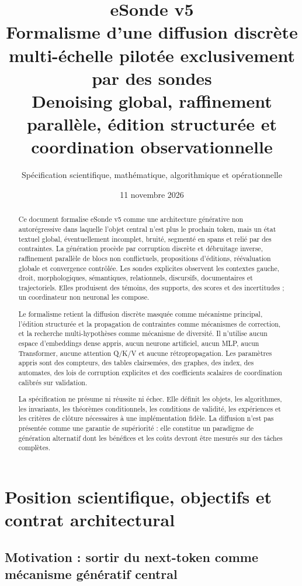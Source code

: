 \documentclass[11pt,a4paper,oneside]{report}
\title{\Huge eSonde v5\\[0.4em]\Large Formalisme d'une diffusion discrète multi-échelle pilotée exclusivement par des sondes\\[0.8em]\normalsize Denoising global, raffinement parallèle, édition structurée et coordination observationnelle}
\author{Spécification scientifique, mathématique, algorithmique et opérationnelle}
\date{11 novembre 2026}
\begin{document}
\maketitle
\begin{abstract}
Ce document formalise eSonde v5 comme une architecture générative non autorégressive dans laquelle l'objet central n'est plus le prochain token, mais un état textuel global, éventuellement incomplet, bruité, segmenté en spans et relié par des contraintes. La génération procède par corruption discrète et débruitage inverse, raffinement parallèle de blocs non conflictuels, propositions d'éditions, réévaluation globale et convergence contrôlée. Les sondes explicites observent les contextes gauche, droit, morphologiques, sémantiques, relationnels, discursifs, documentaires et trajectoriels. Elles produisent des témoins, des supports, des scores et des incertitudes ; un coordinateur non neuronal les compose.

Le formalisme retient la diffusion discrète masquée comme mécanisme principal, l'édition structurée et la propagation de contraintes comme mécanismes de correction, et la recherche multi-hypothèses comme mécanisme de diversité. Il n'utilise aucun espace d'embeddings dense appris, aucun neurone artificiel, aucun MLP, aucun Transformer, aucune attention Q/K/V et aucune rétropropagation. Les paramètres appris sont des compteurs, des tables clairsemées, des graphes, des index, des automates, des lois de corruption explicites et des coefficients scalaires de coordination calibrés sur validation.

La spécification ne présume ni réussite ni échec. Elle définit les objets, les algorithmes, les invariants, les théorèmes conditionnels, les conditions de validité, les expériences et les critères de clôture nécessaires à une implémentation fidèle. La diffusion n'est pas présentée comme une garantie de supériorité : elle constitue un paradigme de génération alternatif dont les bénéfices et les coûts devront être mesurés sur des tâches complètes.
\end{abstract}
\tableofcontents

\part{Position scientifique, objectifs et contrat architectural}
\chapter{Motivation : sortir du next-token comme mécanisme génératif central}
\end{document}
